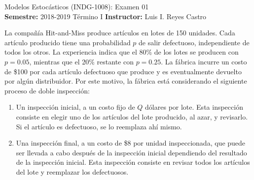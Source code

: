 \documentclass[ a4paper, twoside, 11pt]{article}
\newcommand{\numero}{01}
\begin{document}
\allowdisplaybreaks



\begin{center}
\Large Modelos Estoc\'asticos (INDG-1008): Examen \numero \\[1ex]
\small \textbf{Semestre:} 2018-2019 T\'ermino I \qquad
\textbf{Instructor:} Luis I. Reyes Castro
\end{center}
\fullskip

\begin{problem}
La compa\~n\'ia Hit-and-Miss produce art\'iculos en lotes de 150 unidades. Cada art\'iculo producido tiene una probabilidad $p$ de salir defectuoso, independiente de todos los otros. La experiencia indica que el 80\% de los lotes se producen con $p = 0.05$, mientras que el 20\% restante con $p = 0.25$. La f\'abrica incurre un costo de \$100 por cada art\'iculo defectuoso que produce y es eventualmente devuelto por alg\'un distribuidor. Por este motivo, la f\'abrica est\'a considerando el siguiente proceso de doble inspecci\'on: 
\begin{enumerate}
\item Un inspecci\'on inicial, a un costo fijo de $Q$ d\'olares por lote. Esta inspecci\'on consiste en elegir uno de los art\'iculos del lote producido, al azar, y revisarlo. Si el art\'iculo es defectuoso, se lo reemplaza ah\'i mismo. 
\item Una inspecci\'on final, a un costo de \$8 por unidad inspeccionada, que puede ser llevada a cabo despu\'es de la inspecci\'on inicial dependiendo del resultado de la inspecci\'on inicial. Esta inspecci\'on consiste en revisar todos los art\'iculos del lote y reemplazar los defectuosos. 
\end{enumerate}


\end{problem}
\end{document}
